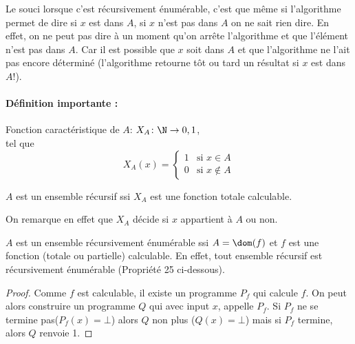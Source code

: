 \begin{myrem}
	Le souci lorsque c'est récursivement énumérable,
	c'est que même si l'algorithme permet de dire si $x$ est dans $A$, si $x$
	n'est pas dans $A$ on ne sait rien dire. En effet, on ne peut pas dire à un moment qu'on
	arrête l'algorithme et que l'élément n'est pas dans $A$.
       	Car il est possible que $x$ soit dans $A$ et que l'algorithme ne
	l'ait pas encore déterminé (l'algorithme retourne tôt ou tard un
	résultat si $x$ est dans $A$!).
\end{myrem}

\paragraph{Définition importante :}
\label{par:d_finition_importante}

\begin{mydef}
	Fonction caractéristique de $A$:
	$X_A \colon \N \to {0,1}$, \\
	tel que
    \[ X_A(x) =
      \begin{cases}
        1 & \text{si }x \in A \\
        0 & \text{si }x \notin A
      \end{cases}
    \]
\end{mydef}

\begin{myprop}
	$A$ est un ensemble récursif ssi $X_A$ est une fonction totale	calculable.

    On remarque en effet que $X_A$ décide si $x$ appartient à $A$ ou non.
\end{myprop}

\begin{myprop}
	$A$ est un ensemble récursivement énumérable ssi $A = \dom(f)$ et $f$ est une fonction (totale ou partielle) calculable. En effet, tout ensemble récursif est récursivement énumérable (Propriété 25 ci-dessous).

    \begin{proof}
      Comme $f$ est calculable,
      il existe un programme $P_f$ qui calcule $f$.
      On peut alors construire un programme $Q$ qui avec input $x$,
      appelle $P_f$.
      Si $P_f$ ne se termine pas($P_f(x) = \bot$) alors $Q$ non plus ($Q(x)= \bot$) mais si $P_f$ termine, alors $Q$ renvoie 1.
    \end{proof}
\end{myprop}

